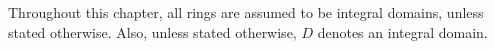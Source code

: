 Throughout this chapter, all rings are assumed to be integral domains, unless stated otherwise.
Also, unless stated otherwise, $D$ denotes an integral domain.